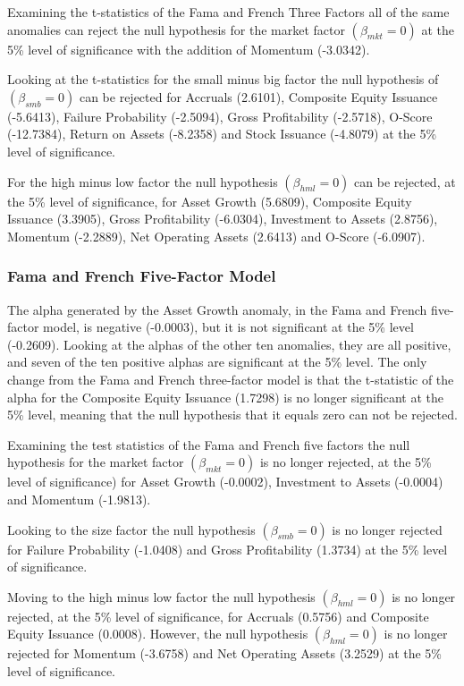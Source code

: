 \documentclass[a4paper]{article}                 %
\begin{document}
Examining the t-statistics of the Fama and French Three Factors all of the same anomalies can reject the null hypothesis for the market factor $(\beta_{mkt}= 0)$ at the 5\% level of significance with the addition of Momentum (-3.0342). 

Looking at the t-statistics for the small minus big factor the null hypothesis of $(\beta_{smb}= 0)$ can be rejected for Accruals (2.6101), Composite Equity Issuance (-5.6413), Failure Probability (-2.5094), Gross Profitability (-2.5718), O-Score (-12.7384), Return on Assets (-8.2358) and Stock Issuance (-4.8079) at the 5\% level of significance. 

For the high minus low factor the null hypothesis $(\beta_{hml}= 0)$ can be rejected, at the 5\% level of significance, for Asset Growth (5.6809), Composite Equity Issuance (3.3905), Gross Profitability (-6.0304), Investment to Assets (2.8756), Momentum (-2.2889), Net Operating Assets (2.6413) and O-Score (-6.0907).

\subsubsection{Fama and French Five-Factor Model}
The alpha generated by the Asset Growth anomaly, in the Fama and French five-factor model, is negative (-0.0003), but it is not significant at the 5\% level (-0.2609). Looking at the alphas of the other ten anomalies, they are all positive, and seven of the ten positive alphas are significant at the 5\% level. The only change from the Fama and French three-factor model is that the t-statistic of the alpha for the Composite Equity Issuance (1.7298) is no longer significant at the 5\% level, meaning that the null hypothesis that it equals zero can not be rejected.

Examining the test statistics of the Fama and French five factors the null hypothesis for the market factor $(\beta_{mkt}= 0)$ is no longer rejected, at the 5\% level of significance) for Asset Growth (-0.0002), Investment to Assets (-0.0004) and Momentum (-1.9813). 

Looking to the size factor the null hypothesis $(\beta_{smb}= 0)$ is no longer rejected for Failure Probability (-1.0408) and Gross Profitability (1.3734) at the 5\% level of significance.

Moving to the high minus low factor the null hypothesis $(\beta_{hml}= 0)$ is no longer rejected, at the 5\% level of significance, for Accruals (0.5756) and Composite Equity Issuance (0.0008). However, the null hypothesis $(\beta_{hml}= 0)$ is no longer rejected for Momentum (-3.6758) and Net Operating Assets (3.2529) at the 5\% level of significance.
\end{document}

